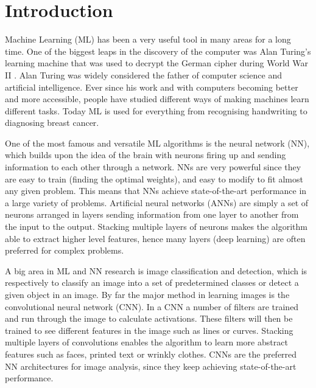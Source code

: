 \section{Introduction} \label{tex:introduction}

Machine Learning (ML) has been a very useful tool in many areas for a long time. One of the biggest leaps in the discovery of the computer was Alan Turing's learning machine that was used to decrypt the German cipher during World War II \cite{turing}. Alan Turing was widely considered the father of computer science and artificial intelligence\cite{Beavers2013}. Ever since his work and with computers becoming better and more accessible, people have studied different ways of making machines learn different tasks. Today ML is used for everything from recognising handwriting to diagnosing breast cancer\cite{Khuriwal2018}. 

One of the most famous and versatile ML algorithms is the neural network (NN), which builds upon the idea of the brain with neurons firing up and sending information to each other through a network. NNs are very powerful since they are easy to train (finding the optimal weights), and easy to modify to fit almost any given problem. This means that NNs achieve state-of-the-art performance in a large variety of problems. Artificial neural networks (ANNs) are simply a set of neurons arranged in layers sending information from one layer to another from the input to the output. Stacking multiple layers of neurons makes the algorithm able to extract higher level features\cite{deepLearning}, hence many layers (deep learning) are often preferred for complex problems.

A big area in ML and NN research is image classification and detection, which is respectively to classify an image into a set of predetermined classes or detect a given object in an image. By far the major method in learning images is the convolutional neural network (CNN). In a CNN a number of filters are trained and run through the image to calculate activations. These filters will then be trained to see different features in the image such as lines or curves. Stacking multiple layers of convolutions enables the algorithm to learn more abstract features such as faces, printed text or wrinkly clothes\cite{Yosinski2015}. CNNs are the preferred NN architectures for image analysis, since they keep achieving state-of-the-art performance.

